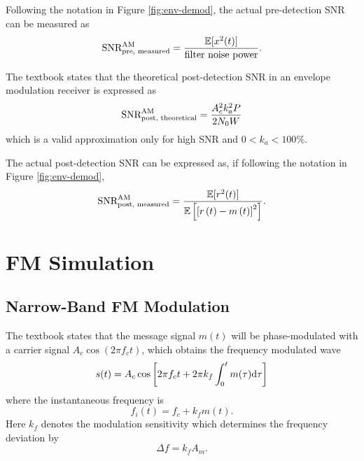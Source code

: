 \documentclass[../ECE459FinalProjectReport.tex]{subfiles}
\begin{document}
Following the notation in Figure \ref{fig:env-demod}, the actual pre-detection SNR can be measured as
\begin{equation}
    \text{SNR}_{\text{pre, measured}}^{\text{AM}} = \frac{\mathbb{E}[x^2(t)]}{\text{filter noise power}}.
\end{equation}

The textbook \cite[Eq. (9.23)]{haykinIntroductionAnalogDigital2007} states that the theoretical post-detection SNR in an envelope modulation receiver is expressed as
\begin{equation}
    \text{SNR}_{\text{post, theoretical}}^{\text{AM}} = \frac{A_c^2 k_a^2 P}{2N_0 W}
\end{equation}
which is a valid approximation only for high SNR and $0<k_a<100\%$.

The actual post-detection SNR can be expressed as, if following the notation in Figure \ref{fig:env-demod},
\begin{equation}
    \text{SNR}_{\text{post, measured}}^{\text{AM}} = \frac{\mathbb{E}[r^2(t)]}{\mathbb{E}\left[ \left[ r\left(t\right) - m\left(t\right) \right]^2 \right]}.
\end{equation}


\section{FM Simulation}
\subsection{Narrow-Band FM Modulation}
The textbook \cite[Sec. 4.1]{haykinIntroductionAnalogDigital2007} states that the message signal $m(t)$ will be phase-modulated with a carrier signal $A_c \cos\left(2\pi f_c t\right)$, which obtains the frequency modulated wave
\begin{equation}
    \label{eq:fm_modulated}
    s(t) = A_c \cos\left[ 2\pi f_c t + 2\pi k_f \int_0^{t} m(\tau) \mathrm{d}\tau \right]
\end{equation}
where the instantaneous frequency is
\begin{equation}
    f_i(t) = f_c + k_f m(t).
\end{equation}
Here $k_f$ denotes the modulation sensitivity which determines the frequency deviation by
\begin{equation}
    \Delta f = k_f A_m.
\end{equation}
\end{document}

